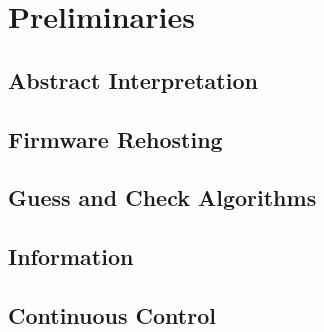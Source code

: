 \chapter{Preliminaries}

\section{Abstract Interpretation}

\section{Firmware Rehosting}

\section{Guess and Check Algorithms}

\section{Information}

\section{Continuous Control}

